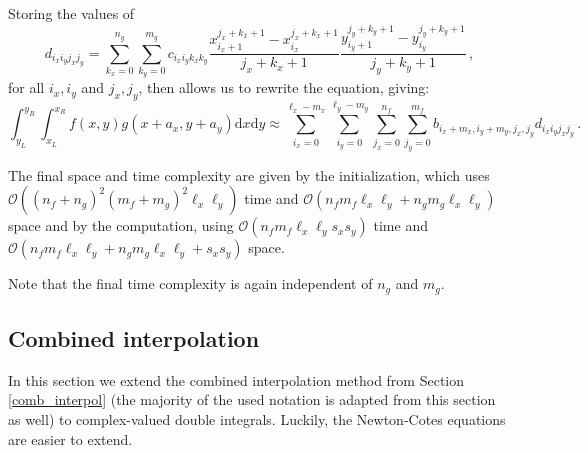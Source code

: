 Storing the values of
\begin{equation}
    d_{i_xi_yj_xj_y} = \sum_{k_x=0}^{n_g}\sum_{k_y=0}^{m_g} c_{i_xi_yk_xk_y} \frac{x_{i_x+1}^{j_x+k_x+1} - x_{i_x}^{j_x+k_x+1}}{j_x+k_x+1}  \frac{y_{i_y+1}^{j_y+k_y+1} - y_{i_y}^{j_y+k_y+1}}{j_y+k_y+1} \,, \nonumber
\end{equation}
for all $i_x,i_y$ and $j_x,j_y$, then allows us to rewrite the equation, giving:
\begin{equation}
    \int_{y_L}^{y_R}\int_{x_L}^{x_R} f(x,y) g(x+a_x,y+a_y) \mathrm d x \mathrm dy \approx \sum_{i_x=0}^{\ell_x-m_x}\sum_{i_y=0}^{\ell_y-m_y} \sum_{j_x=0}^{n_f}\sum_{j_y=0}^{m_f} b_{i_x+m_x,i_y+m_y,j_x,j_y} d_{i_xi_yj_xj_y} \,.\nonumber
\end{equation}

The final space and time complexity are given by the initialization, which uses $\mathcal O((n_f+n_g)^2(m_f+m_g)^2 \ell_x \ell_y)$ time and $\mathcal O(n_fm_f\ell_x \ell_y + n_gm_g\ell_x \ell_y)$ space and by the computation, using $\mathcal O(n_f m_f \ell_x \ell_y s_x s_y)$ time and $\mathcal O(n_f m_f \ell_x \ell_y + n_g m_g \ell_x \ell_y + s_x s_y)$ space.

Note that the final time complexity is again independent of $n_g$ and $m_g$.


\subsection{Combined interpolation}
\label{comb_interpol_3d}
In this section we extend the combined interpolation method from Section \ref{comb_interpol} (the majority of the used notation is adapted from this section as well) to complex-valued double integrals.
Luckily, the Newton-Cotes equations are easier to extend.

